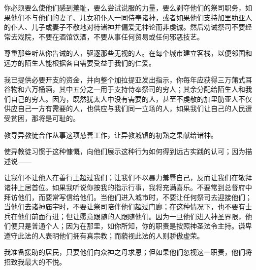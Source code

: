你必须要么使他们感到羞耻，要么尝试说服的力量，要么剥夺他们的祭司职务，如果他们不与他们的妻子、儿女和仆人一同侍奉诸神，或者如果他们支持加里肋亚人的仆人、儿子或妻子不敬地对待诸神并偏爱无神论而非虔诚。然后劝诫祭司不要经常去戏院，不要在酒馆饮酒，不要从事任何贸易或任何邪恶技艺。\par

尊重那些听从你告诫的人，驱逐那些无视的人。在每个城市建立客栈，以便邻国和远方的陌生人能根据各自需要受益于我们的仁爱。\par

我已提供必要开支的资金，并向整个加拉提亚发出指示，你每年应获得三万蒲式耳谷物和六万桶酒，其中五分之一用于支持侍奉祭司的穷人；其余分配给陌生人和我们自己的穷人。因为，既然犹太人中没有需要的人，甚至不虔敬的加里肋亚人不仅供应自己一方有需要的人，也供应与我们同一立场的人，如果我们让自己的人民遭受贫困，那将是可耻的。\par

教导异教徒合作从事这项慈善工作，让异教城镇的初熟之果献给诸神。\par

使异教徒习惯于这种慷慨，向他们展示这种行为如何得到远古实践的认可；因为描述说——\par

\par

让我们不让他人在善行上超过我们；让我们不以暴力羞辱自己，反而让我们在敬拜诸神上居首位。如果我听说你按我的指示行事，我将充满喜乐。不要常到总督府中拜访他们，而要常写信给他们。当他们进入城市时，不要让任何祭司去迎接他们；当他们去诸神庙宇时，不要让祭司陪伴他们超过门廊；在这种情况下，也不要有士兵在他们前面行进；但让愿意跟随的人跟随他们。因为一旦他们进入神圣界限，他们便只是普通个人；因为在那里，如你所知，你的职责是按照神圣法令主持。谦卑遵守此法的人表明他们拥有真宗教；而藐视此法的人则骄傲虚荣。\par

我准备援助的居民，只要他们向众神之母求恩；但如果他们忽视这一职责，他们将招致我最大的不悦。\par

\par

